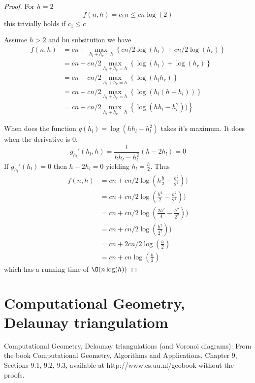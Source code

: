 \documentclass[10pt]{article}
\begin{document}
\begin{proof}

  For $h=2$                
  \begin{equation}
    f(n,h) = c_1n \leq cn\log(2)
  \end{equation}
  this trivially holds if $c_1 \leq c$
  
  Assume $h>2$ and bu subsitution we have
  \begin{align*}
   f(n,h) &= cn + \max_{h_l+h_r = h}\left\{cn/2\log(h_l)+cn/2\log(h_r)\right\} \\
          &= cn + cn/2\max_{h_l+h_r = h}\left\{\log(h_l)+\log(h_r)\right\} \\
          &= cn + cn/2\max_{h_l+h_r = h}\left\{\log(h_lh_r)\right\} \\          
          &= cn + cn/2\max_{h_l+h_r = h}\left\{\log(h_l(h-h_l))\right\} \\         
          &= cn + cn/2\max_{h_l+h_r = h}\left\{\log(hh_l-h_l^2))\right\}                    
  \end{align*}
    
  When does the function $g(h_l) = \log(hh_l-h_l^2)$ takes it's maximum. It does when the derivative is $0$.
  \begin{equation}
    g_{h_l}'(h_l,h) = \frac{1}{hh_l-h_l^2} (h-2h_l) = 0 
  \end{equation}
  If $g_{h_l}'(h_l)=0$ then $h-2h_l=0$ yielding $h_l = \frac{h}{2}$. Thus
  \begin{align*}
   f(n,h) &= cn + cn/2\log(h\frac{h}{2}-\frac{h^2}{2^2})) \\
          &= cn + cn/2\log(\frac{h^2}{2}-\frac{h^2}{2^2})) \\   
          &= cn + cn/2\log(\frac{2h^2}{4}-\frac{h^2}{2^2})) \\
          &= cn + cn/2\log(\frac{h^2}{2^2})) \\                       
          &= cn + 2cn/2\log(\frac{h}{2}) \\                                 
          &= cn + cn\log(\frac{h}{2})                                 
  \end{align*}
   which has a running time of $\O(n\log(h))$
   
\end{proof}






\section{Computational Geometry, Delaunay triangulatiom} %
\label{sec:computational_geometry_delaunay_triangulatiom}
Computational Geometry, Delaunay triangulations (and Voronoi diagrams): From the  book Computational Geometry, Algorithms and Applications, Chapter 9,  Sections 9.1, 9.2, 9.3, available at http://www.cs.uu.nl/geobook  without the proofs.                                                                  
\end{document}
